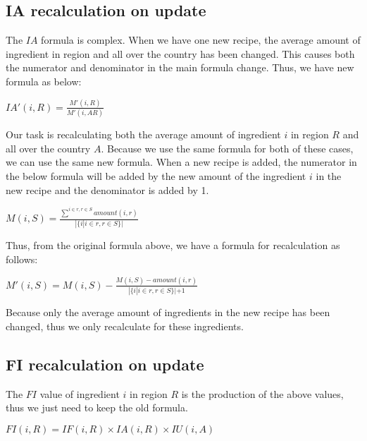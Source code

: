 \subsection{IA recalculation on update}
The $IA$ formula is complex. When we have one new recipe, the average amount of ingredient in region and all over the country has been changed. This causes both the numerator and denominator in the main formula change. Thus, we have new formula as below: 

\begin{center}
\smallskip
$IA'(i,R)= \frac{\displaystyle M'(i,R)}{\displaystyle M'(i,AR)}$
\smallskip
\end{center}

Our task is recalculating both the average amount of ingredient $i$ in region $R$ and all over the country $A$. Because we use the same formula for both of these cases, we can use the same new formula.
When a new recipe is added, the numerator in the below formula will be added by the new amount of the ingredient $i$ in the new recipe and the denominator is added by 1.
 
\begin{center}
\smallskip
$M(i,S)= \frac{\displaystyle \sum_{}^{i \in r, r \in S} amount(i,r)}{\displaystyle |\{i|i \in r, r \in S\}|}$
\smallskip
\end{center}

Thus, from the original formula above, we have a formula for recalculation as follows:

\begin{center}
\smallskip
$M'(i,S)= M(i,S)- \frac{\displaystyle M(i,S)-amount(i,r)}{\displaystyle |\{i|i \in r, r \in S\}|+1}$
\smallskip
\end{center}

Because only the average amount of ingredients in the new recipe has been changed, thus we only recalculate for these ingredients. 

\subsection{FI recalculation on update}

The $FI$ value of ingredient $i$ in region $R$ is the production of the above values, thus we just need to keep the old formula.
 
\begin{center}
\smallskip
$FI(i,R)= IF(i,R) \times IA(i,R) \times IU(i,A)$ 
\smallskip
\end{center}